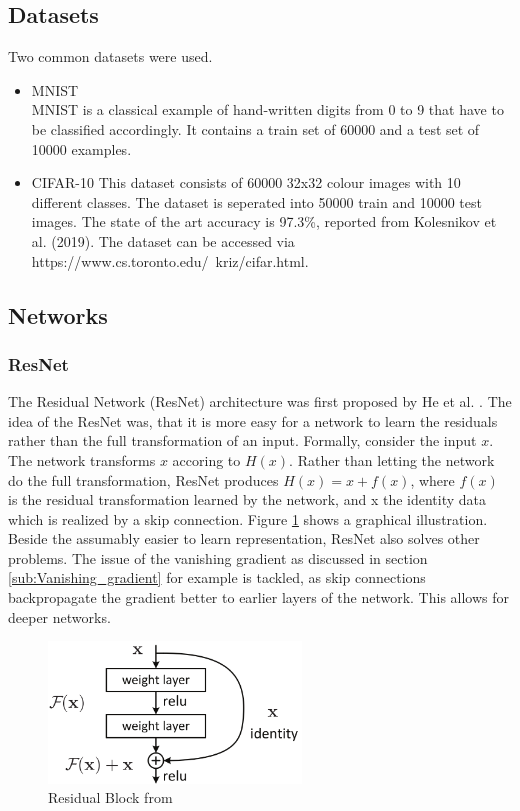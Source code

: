 \subsection{Datasets}
Two common datasets were used.
\begin{itemize}
    \item MNIST \\
    MNIST is a classical example of hand-written digits from 0 to 9 that have to
    be classified accordingly. It contains a train set of 60000 and a test set
    of 10000 examples.
    \item CIFAR-10
    This dataset consists of 60000 32x32 colour images with 10 different
    classes. The dataset is seperated into 50000 train and 10000 test images.
    The state of the art accuracy is 97.3\%, reported from Kolesnikov et al.
    (2019). The dataset can be accessed via https://www.cs.toronto.edu/~kriz/cifar.html.
\end{itemize}
\subsection{Networks}
\subsubsection{ResNet}
The Residual Network (ResNet) architecture was first proposed by He et al.
\cite{he2016deep}. The idea of the ResNet was, that it is more easy for a
network to learn the residuals rather than the full transformation of an input.
Formally, consider the input $x$. The network transforms $x$ accoring to $H(x)$.
Rather than letting the network do the full transformation, ResNet produces
$H(x)= x +f(x)$, where $f(x)$ is the residual transformation learned by the
network, and x the identity data which is realized by a skip connection. Figure
\ref{fig:Residual_Block} shows a graphical illustration. Beside the assumably
easier to learn representation, ResNet also solves other problems. The issue of
the vanishing gradient as discussed in section \ref{sub:Vanishing_gradient} for
example is tackled, as skip connections backpropagate the gradient better to
earlier layers of the network. This allows for deeper networks.

\begin{figure}[h]\label{fig:Residual_Block}
    \centering
    \includegraphics[width=0.6\textwidth]{images/Residual_Block.png}
    \caption{Residual Block from \cite[Page 2]{he2016deep}\newline 
   }
\end{figure}

